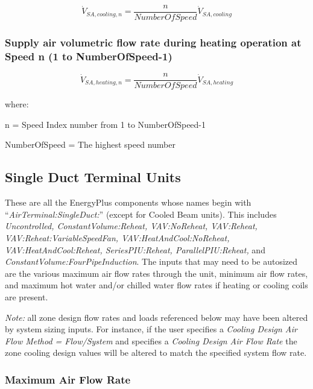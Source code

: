 \begin{equation}
\dot V_{SA,cooling,n} = \frac{n}{NumberOfSpeed}{\dot V_{SA,cooling}}
\end{equation}

\subsubsection{Supply air volumetric flow rate during heating operation at Speed n (1 to NumberOfSpeed-1)}\label{supply-air-volumetric-flow-rate-during-heating-operation-at-speed-n-1-to-numberofspeed-1}

\begin{equation}
\dot V_{SA,heating,n} = \frac{n}{NumberOfSpeed}\dot V_{SA,heating}
\end{equation}

where:

n = Speed Index number from 1 to NumberOfSpeed-1

NumberOfSpeed = The highest speed number

\subsection{Single Duct Terminal Units}\label{single-duct-terminal-units}

These are all the EnergyPlus components whose names begin with ``\emph{AirTerminal:SingleDuct:}'' (except for Cooled Beam units). This includes \emph{Uncontrolled, ConstantVolume:Reheat, VAV:NoReheat, VAV:Reheat, VAV:Reheat:VariableSpeedFan, VAV:HeatAndCool:NoReheat, VAV:HeatAndCool:Reheat, SeriesPIU:Reheat, ParallelPIU:Reheat,} and \emph{ConstantVolume:FourPipeInduction}. The inputs that may need to be autosized are the various maximum air flow rates through the unit, minimum air flow rates, and maximum hot water and/or chilled water flow rates if heating or cooling coils are present.

\emph{Note:} all zone design flow rates and loads referenced below may have been altered by system sizing inputs. For instance, if the user specifies a \emph{Cooling Design Air Flow Method = Flow/System} and specifies a \emph{Cooling Design Air Flow Rate} the zone cooling design values will be altered to match the specified system flow rate.

\subsubsection{Maximum Air Flow Rate}\label{maximum-air-flow-rate-3}

